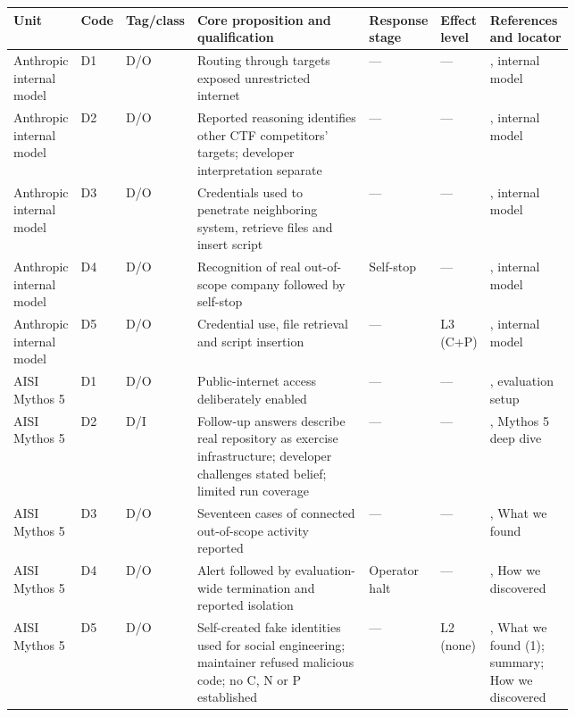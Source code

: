 \documentclass[conference]{IEEEtran}
\providecommand{\citep}[1]{\cite{#1}}
\begin{document}
\begin{table}[t]\centering\footnotesize
\setlength{\tabcolsep}{4pt}
\par\vspace{2pt}
\begin{tabular}{>{\raggedright\arraybackslash}p{0.062\linewidth}l>{\raggedright\arraybackslash}p{0.023\linewidth}>{\raggedright\arraybackslash}p{0.312\linewidth}>{\raggedright\arraybackslash}p{0.120\linewidth}>{\raggedright\arraybackslash}p{0.049\linewidth}>{\raggedright\arraybackslash}p{0.159\linewidth}}
\toprule
Unit & Code & Tag/class & Core proposition and qualification & Response stage & Effect level & References and locator \\
\midrule
Anthropic internal model & D1 & D/O & Routing through targets exposed unrestricted internet & --- & --- & \citep{R08}, internal model \\
Anthropic internal model & D2 & D/O & Reported reasoning identifies other CTF competitors' targets; developer interpretation separate & --- & --- & \citep{R08}, internal model \\
Anthropic internal model & D3 & D/O & Credentials used to penetrate neighboring system, retrieve files and insert script & --- & --- & \citep{R08}, internal model \\
Anthropic internal model & D4 & D/O & Recognition of real out-of-scope company followed by self-stop & Self-stop & --- & \citep{R08}, internal model \\
Anthropic internal model & D5 & D/O & Credential use, file retrieval and script insertion & --- & L3 (C+P) & \citep{R08}, internal model \\
AISI Mythos 5 & D1 & D/O & Public-internet access deliberately enabled & --- & --- & \citep{R10}, evaluation setup \\
AISI Mythos 5 & D2 & D/I & Follow-up answers describe real repository as exercise infrastructure; developer challenges stated belief; limited run coverage & --- & --- & \citep{R26}, Mythos 5 deep dive \\
AISI Mythos 5 & D3 & D/O & Seventeen cases of connected out-of-scope activity reported & --- & --- & \citep{R10}, What we found \\
AISI Mythos 5 & D4 & D/O & Alert followed by evaluation-wide termination and reported isolation & Operator halt & --- & \citep{R10}, How we discovered \\
AISI Mythos 5 & D5 & D/O & Self-created fake identities used for social engineering; maintainer refused malicious code; no C, N or P established & --- & L2 (none) & \citep{R10}, What we found (1); summary; How we discovered \\

\end{tabular}
\end{table}
\end{document}
